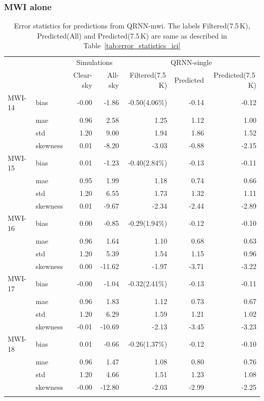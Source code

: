 \documentclass[amt, manuscript]{copernicus}
\begin{document}
\subsubsection{MWI alone}
%
\begin{table}[t]
	\caption{Error statistics for predictions from QRNN-mwi. The labels Filtered(7.5\,K), Predicted(All) and Predicted(7.5\,K) are same as described in Table~\ref{tab:error_statistics_ici}}
	\label{tab:statistics_mwi-alone}
	\begin{tabular}{llrr|rrr}
		\tophline
		&&\multicolumn{2}{c|}{Simulations}& \multicolumn{3}{c}{QRNN-single} \\
		\cline{3-7}
		&&   Clear-sky &   All-sky &  Filtered(7.5\,K) & Predicted & Predicted(7.5\,K) \\
		\middlehline
		MWI-14 		&bias     & -0.00 & -1.86 & -0.50(4.06\%) & -0.14 & -0.12 \\
					&mae      &  0.96 &  2.58 &  1.25 &  1.12 &  1.00 \\
					&std      &  1.20 &  9.00 &  1.94 &  1.86 &  1.52 \\
					&skewness &  0.01 & -8.20 & -3.03 & -0.88 & -2.15 \\ 
		\middlehline
		MWI-15 		&bias     & 0.01 & -1.23 & -0.40(2.84\%) & -0.13 & -0.11 \\
					&mae      & 0.95 &  1.99 &  1.18 &  0.74 &  0.66 \\
					&std      & 1.20 &  6.55 &  1.73 &  1.32 &  1.11 \\
					&skewness & 0.01 & -9.67 & -2.34 & -2.44 & -2.89 \\
		\middlehline	
		MWI-16 		&bias     & 0.00 &  -0.85 & -0.29(1.94\%) & -0.12 & -0.10 \\
					&mae      & 0.96 &   1.64 &  1.10 &  0.68 &  0.63 \\
					&std      & 1.20 &   5.39 &  1.54 &  1.15 &  0.96 \\
					&skewness & 0.00 & -11.62 & -1.97 & -3.71 & -3.22 \\	
		\middlehline			
		MWI-17 		&bias     & -0.00 &  -1.04 & -0.32(2.41\%) & -0.13 & -0.11 \\
					&mae      &  0.96 &   1.83 &  1.12 &  0.73 &  0.67 \\
					&std      &  1.20 &   6.29 &  1.59 &  1.21 &  1.02 \\
					&skewness & -0.01 & -10.69 & -2.13 & -3.45 & -3.23 \\	
		\middlehline			
		MWI-18 		&bias     &  0.01 &  -0.66 & -0.26(1.37\%) & -0.12 & -0.10 \\
					&mae      &  0.96 &   1.47 &  1.08 &  0.80 &  0.76 \\
					&std      &  1.20 &   4.66 &  1.51 &  1.23 &  1.08 \\
					&skewness & -0.00 & -12.80 & -2.03 & -2.99 & -2.25 \\	
		\bottomhline				
	\end{tabular}	
	\belowtable{} %
\end{table}
\end{document}
